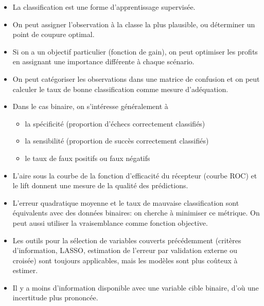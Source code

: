\documentclass[
  11pt,
  letterpaper,
]{scrbook}
\providecommand{\tightlist}{%
  \setlength{\itemsep}{0pt}\setlength{\parskip}{0pt}}\usepackage{longtable,booktabs,array}
\theoremstyle{definition}
\theoremstyle{remark}
\begin{document}
\begin{tcolorbox}[enhanced jigsaw, coltitle=black, left=2mm, opacitybacktitle=0.6, colback=white, leftrule=.75mm, colframe=quarto-callout-note-color-frame, toprule=.15mm, colbacktitle=quarto-callout-note-color!10!white, opacityback=0, bottomtitle=1mm, toptitle=1mm, rightrule=.15mm, title=\textcolor{quarto-callout-note-color}{\faInfo}\hspace{0.5em}{En résumé}, breakable, titlerule=0mm, arc=.35mm, bottomrule=.15mm]

\begin{itemize}
\tightlist
\item
  La classification est une forme d'apprentissage supervisée.
\item
  On peut assigner l'observation à la classe la plus plausible, ou
  déterminer un point de coupure optimal.
\item
  Si on a un objectif particulier (fonction de gain), on peut optimiser
  les profits en assignant une importance différente à chaque scénario.
\item
  On peut catégoriser les observations dans une matrice de confusion et
  on peut calculer le taux de bonne classification comme mesure
  d'adéquation.
\item
  Dans le cas binaire, on s'intéresse généralement à

  \begin{itemize}
  \tightlist
  \item
    la spécificité (proportion d'échecs correctement classifiés)
  \item
    la sensibilité (proportion de succès correctement classifiés)
  \item
    le taux de faux positifs ou faux négatifs
  \end{itemize}
\item
  L'aire sous la courbe de la fonction d'efficacité du récepteur (courbe
  ROC) et le lift donnent une mesure de la qualité des prédictions.
\item
  L'erreur quadratique moyenne et le taux de mauvaise classification
  sont équivalents avec des données binaires: on cherche à minimiser ce
  métrique. On peut aussi utiliser la vraisemblance comme fonction
  objective.
\item
  Les outils pour la sélection de variables couverts précédemment
  (critères d'information, LASSO, estimation de l'erreur par validation
  externe ou croisée) sont toujours applicables, mais les modèles sont
  plus coûteux à estimer.
\item
  Il y a moins d'information disponible avec une variable cible binaire,
  d'où une incertitude plus prononcée.
\end{itemize}

\end{tcolorbox}
\end{document}
